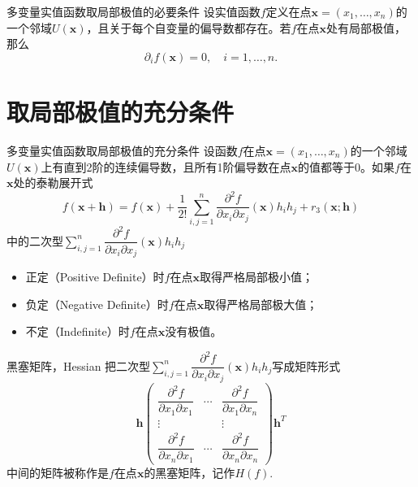 \begin{frame}

\begin{block}{多变量实值函数取局部极值的必要条件}
设实值函数$f$定义在点$\mathbf{x} = (x_1,\ldots,x_n)$的一个邻域$U(\mathbf{x})$，且关于每个自变量的偏导数都存在。若$f$在点$\mathbf{x}$处有局部极值，那么
$$\partial_i f(\mathbf{x}) = 0, \quad i = 1,\ldots,n.$$
\end{block}

\end{frame}


\section{取局部极值的充分条件}


\begin{frame}

\begin{block}{多变量实值函数取局部极值的充分条件}
设函数$f$在点$\mathbf{x} = (x_1,\ldots,x_n)$的一个邻域$U(\mathbf{x})$上有直到2阶的连续偏导数，且所有1阶偏导数在点$\mathbf{x}$的值都等于0。如果$f$在$\mathbf{x}$处的泰勒展开式
$$f(\mathbf{x} + \mathbf{h}) = f(\mathbf{x}) + \dfrac{1}{2!} \sum\limits_{i,j=1}^n \dfrac{\partial^2 f}{\partial x_i \partial x_j}(\mathbf{x})h_ih_j + r_3(\mathbf{x}; \mathbf{h})$$
中的二次型\(\displaystyle \sum\limits_{i,j=1}^n \dfrac{\partial^2 f}{\partial x_i \partial x_j}(\mathbf{x})h_ih_j\)
\begin{itemize}
\item 正定（Positive Definite）时$f$在点$\mathbf{x}$取得严格局部极小值；
\item 负定（Negative Definite）时$f$在点$\mathbf{x}$取得严格局部极大值；
\item 不定（Indefinite）时$f$在点$\mathbf{x}$没有极值。
\end{itemize}
\end{block}

\end{frame}


\begin{frame}

\begin{block}{黑塞矩阵，Hessian}
把二次型\(\displaystyle \sum\limits_{i,j=1}^n \dfrac{\partial^2 f}{\partial x_i \partial x_j}(\mathbf{x})h_ih_j\)写成矩阵形式
$$\mathbf{h}\begin{pmatrix}
\dfrac{\partial^2 f}{\partial x_1 \partial x_1} & \cdots & \dfrac{\partial^2 f}{\partial x_1 \partial x_n} \\
\vdots & & \vdots \\
\dfrac{\partial^2 f}{\partial x_n \partial x_1} & \cdots & \dfrac{\partial^2 f}{\partial x_n \partial x_n}
\end{pmatrix}\mathbf{h}^T$$
中间的矩阵被称作是$f$在点$\mathbf{x}$的黑塞矩阵，记作$H(f).$
\end{block}

\end{frame}

